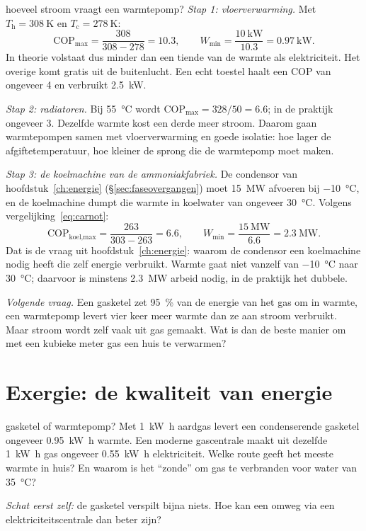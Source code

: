 \begin{casusuitgewerkt}{hoeveel stroom vraagt een warmtepomp?}
\emph{Stap 1: vloerverwarming.} Met $T_\mathrm{h} = \SI{308}{\kelvin}$ en $T_\mathrm{c} = \SI{278}{\kelvin}$:
\[
\mathrm{COP}_\text{max} = \frac{308}{308 - 278} = 10.3, \qquad W_\text{min} = \frac{\SI{10}{\kilo\watt}}{10.3} = \SI{0.97}{\kilo\watt}.
\]
In theorie volstaat dus minder dan een tiende van de warmte als elektriciteit. Het overige komt gratis uit de buitenlucht. Een echt toestel haalt een COP van ongeveer 4 en verbruikt \SI{2.5}{\kilo\watt}.

\emph{Stap 2: radiatoren.} Bij \SI{55}{\celsius} wordt $\mathrm{COP}_\text{max} = 328/50 = 6.6$; in de praktijk ongeveer 3. Dezelfde warmte kost een derde meer stroom. Daarom gaan warmtepompen samen met vloerverwarming en goede isolatie: hoe lager de afgiftetemperatuur, hoe kleiner de sprong die de warmtepomp moet maken.

\emph{Stap 3: de koelmachine van de ammoniakfabriek.} De condensor van hoofdstuk~\ref{ch:energie} (\S\ref{sec:faseovergangen}) moet \SI{15}{\mega\watt} afvoeren bij \SI{-10}{\celsius}, en de koelmachine dumpt die warmte in koelwater van ongeveer \SI{30}{\celsius}. Volgens vergelijking~\eqref{eq:carnot}:
\[
\mathrm{COP}_\text{koel,max} = \frac{263}{303 - 263} = 6.6, \qquad W_\text{min} = \frac{\SI{15}{\mega\watt}}{6.6} = \SI{2.3}{\mega\watt}.
\]
Dat is de vraag uit hoofdstuk~\ref{ch:energie}: waarom de condensor een koelmachine nodig heeft die zelf energie verbruikt. Warmte gaat niet vanzelf van \SI{-10}{\celsius} naar \SI{30}{\celsius}; daarvoor is minstens \SI{2.3}{\mega\watt} arbeid nodig, in de praktijk het dubbele.

\emph{Volgende vraag.} Een gasketel zet \SI{95}{\percent} van de energie van het gas om in warmte, een warmtepomp levert vier keer meer warmte dan ze aan stroom verbruikt. Maar stroom wordt zelf vaak uit gas gemaakt. Wat is dan de beste manier om met een kubieke meter gas een huis te verwarmen?
\end{casusuitgewerkt}

\section{Exergie: de kwaliteit van energie}
\label{sec:exergie}

\begin{casus}{gasketel of warmtepomp?}
Met \SI{1}{\kilo\watt\hour} aardgas levert een condenserende gasketel ongeveer \SI{0.95}{\kilo\watt\hour} warmte. Een moderne gascentrale maakt uit dezelfde \SI{1}{\kilo\watt\hour} gas ongeveer \SI{0.55}{\kilo\watt\hour} elektriciteit. Welke route geeft het meeste warmte in huis? En waarom is het ``zonde'' om gas te verbranden voor water van \SI{35}{\celsius}?

\emph{Schat eerst zelf:} de gasketel verspilt bijna niets. Hoe kan een omweg via een elektriciteitscentrale dan beter zijn?
\end{casus}


